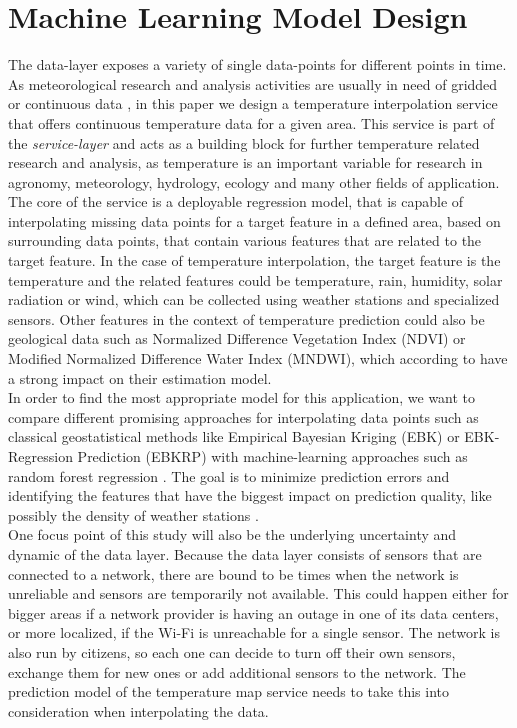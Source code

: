 \chapter{Machine Learning Model Design}
\label{chap:Machine Learning Model Design}

The data-layer exposes a variety of single data-points for different points in time. As meteorological research and analysis activities are usually in need of gridded or continuous data \cite{sekulic2020spatio}, in this paper we design a temperature interpolation service that offers continuous temperature data for a given area. This service is part of the \textit{service-layer} and acts as a building block for further temperature related research and analysis, as temperature is an important variable for research in agronomy, meteorology, hydrology, ecology and many other fields of application.\\
The core of the service is a deployable regression model, that is capable of interpolating missing data points for a target feature in a defined area, based on surrounding data points, that contain various features that are related to the target feature. In the case of temperature interpolation, the target feature is the temperature and the related features could be temperature, rain, humidity, solar radiation or wind, which can be collected using weather stations and specialized sensors. Other features in the context of temperature prediction could also be geological data such as  Normalized Difference Vegetation Index (NDVI) or Modified Normalized Difference Water Index (MNDWI), which according to \cite{alonso2020new} have a strong impact on their estimation model.\\
In order to find the most appropriate model for this application, we want to compare different promising approaches for interpolating data points such as classical geostatistical methods like Empirical Bayesian Kriging (EBK) or EBK-Regression Prediction (EBKRP) \cite{njoku2023effects} with machine-learning approaches such as random forest regression \cite{alonso2020new}. The goal is to minimize prediction errors and identifying the features that have the biggest impact on prediction quality, like possibly the density of weather stations \cite{njoku2023effects}.\\
One focus point of this study will also be the underlying uncertainty and dynamic of the data layer. Because the data layer consists of sensors that are connected to a network, there are bound to be times when the network is unreliable and sensors are temporarily not available. This could happen either for bigger areas if a network provider is having an outage in one of its data centers, or more localized, if the Wi-Fi is unreachable for a single sensor. The network is also run by citizens, so each one can decide to turn off their own sensors, exchange them for new ones or add additional sensors to the network. The prediction model of the temperature map service needs to take this into consideration when interpolating the data.


